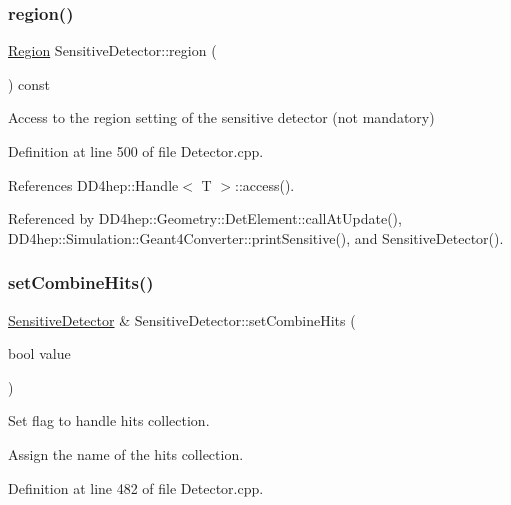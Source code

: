 \subsubsection{\texorpdfstring{region()}{region()}}
{\footnotesize\ttfamily \hyperlink{class_d_d4hep_1_1_geometry_1_1_region}{Region} Sensitive\+Detector\+::region (\begin{DoxyParamCaption}{ }\end{DoxyParamCaption}) const}



Access to the region setting of the sensitive detector (not mandatory) 



Definition at line 500 of file Detector.\+cpp.



References D\+D4hep\+::\+Handle$<$ T $>$\+::access().



Referenced by D\+D4hep\+::\+Geometry\+::\+Det\+Element\+::call\+At\+Update(), D\+D4hep\+::\+Simulation\+::\+Geant4\+Converter\+::print\+Sensitive(), and Sensitive\+Detector().

\hypertarget{class_d_d4hep_1_1_geometry_1_1_sensitive_detector_a934bd9f3b3c239b6fc751f2b68b26016}{}\label{class_d_d4hep_1_1_geometry_1_1_sensitive_detector_a934bd9f3b3c239b6fc751f2b68b26016} 
\subsubsection{\texorpdfstring{set\+Combine\+Hits()}{setCombineHits()}}
{\footnotesize\ttfamily \hyperlink{class_d_d4hep_1_1_geometry_1_1_sensitive_detector}{Sensitive\+Detector} \& Sensitive\+Detector\+::set\+Combine\+Hits (\begin{DoxyParamCaption}\item[{bool}]{value }\end{DoxyParamCaption})}



Set flag to handle hits collection. 

Assign the name of the hits collection. 

Definition at line 482 of file Detector.\+cpp.



